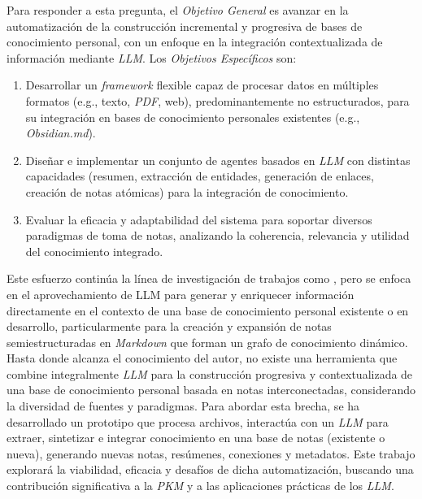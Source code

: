 Para responder a esta pregunta, el \textit{Objetivo General} es avanzar en la automatización de la construcción incremental y progresiva de bases de conocimiento personal, con un enfoque en la integración contextualizada de información mediante \textit{LLM}. Los \textit{Objetivos Específicos} son:
\begin{enumerate}
    \item Desarrollar un \textit{framework} flexible capaz de procesar datos en múltiples formatos (e.g., texto, \textit{PDF}, web), predominantemente no estructurados, para su integración en bases de conocimiento personales existentes (e.g., \textit{Obsidian.md}).
    \item Diseñar e implementar un conjunto de agentes basados en \textit{LLM} con distintas capacidades (resumen, extracción de entidades, generación de enlaces, creación de notas atómicas) para la integración de conocimiento.
    \item Evaluar la eficacia y adaptabilidad del sistema para soportar diversos paradigmas de toma de notas, analizando la coherencia, relevancia y utilidad del conocimiento integrado.
\end{enumerate}

Este esfuerzo continúa la línea de investigación de trabajos como \cite{fragaAutomaticGenerationKnowledge2023}, pero se enfoca en el aprovechamiento de LLM para generar y enriquecer información directamente en el contexto de una base de conocimiento personal existente o en desarrollo, particularmente para la creación y expansión de notas semiestructuradas en \textit{Markdown} que forman un grafo de conocimiento dinámico. Hasta donde alcanza el conocimiento del autor, no existe una herramienta que combine integralmente \textit{LLM} para la construcción progresiva y contextualizada de una base de conocimiento personal basada en notas interconectadas, considerando la diversidad de fuentes y paradigmas. Para abordar esta brecha, se ha desarrollado un prototipo que procesa archivos, interactúa con un \textit{LLM} para extraer, sintetizar e integrar conocimiento en una base de notas (existente o nueva), generando nuevas notas, resúmenes, conexiones y metadatos. Este trabajo explorará la viabilidad, eficacia y desafíos de dicha automatización, buscando una contribución significativa a la \textit{PKM} y a las aplicaciones prácticas de los \textit{LLM}.